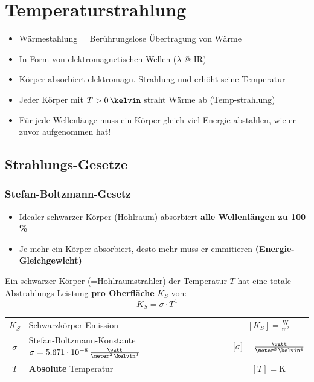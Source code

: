 
\section{Temperaturstrahlung}

\begin{itemize}
	\item Wärmestahlung = Berührungslose Übertragung von Wärme 
	\item In Form von elektromagnetischen Wellen ($\lambda$ @ IR)
	\item Körper absorbiert elektromagn. Strahlung und erhöht seine Temperatur
	\item Jeder Körper mit $T > 0 \, \kelvin$ straht Wärme ab (Temp-strahlung)
	\item Für jede Wellenlänge muss ein Körper gleich viel Energie abstahlen, wie er zuvor aufgenommen hat!
\end{itemize}

\subsection{Strahlungs-Gesetze}

\subsubsection{Stefan-Boltzmann-Gesetz}

\begin{itemize}
	\item Idealer schwarzer Körper (Hohlraum) absorbiert \textbf{alle Wellenlängen zu 100 \%}
	\item Je mehr ein Körper absorbiert, desto mehr muss er emmitieren \textbf{(Energie-Gleichgewicht)}
\end{itemize}


Ein schwarzer Körper (=Hohlraumstrahler) der Temperatur $T$ hat eine totale Abstrahlungs-Leistung \textbf{pro Oberfläche} $K_S$ von: 
$$ \boxed{ K_S = \sigma \cdot T^4 }  $$


\renewcommand{\arraystretch}{1.3}
\begin{tabular}{c l c}
	$K_S$ 		& Schwarzkörper-Emission 																			& $[K_S] = \mathrm{\frac{W}{m^2}}$ 					\\
	$\sigma$ 	& Stefan-Boltzmann-Konstante $\sigma = 5.671 \cdot 10^{-8} \, \frac{\watt}{\meter^2 \, \kelvin^4}$ 	& $[\sigma] = \frac{\watt}{\meter^2 \, \kelvin^4}$	\\
	$T$ 		& \textbf{Absolute} Temperatur 																		& $[T] = \mathrm{K}$
\end{tabular}
\renewcommand{\arraystretch}{1}


